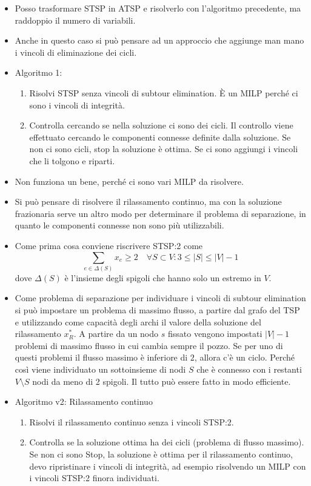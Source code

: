 \begin{itemize}
	\item Posso trasformare STSP in ATSP e risolverlo con l'algoritmo precedente, ma raddoppio il numero di variabili.
	\item Anche in questo caso si può pensare ad un approccio che aggiunge man mano i vincoli di eliminazione dei cicli.
	\item Algoritmo 1:
	\begin{enumerate}
		\item Risolvi STSP senza vincoli di subtour elimination. \`E un MILP perché ci sono i vincoli di integrità.
		\item Controlla cercando se nella soluzione ci sono dei cicli. Il controllo viene effettuato cercando le componenti connesse definite dalla soluzione. Se non ci sono cicli, stop la soluzione è ottima. Se ci sono aggiungi i vincoli che li tolgono e riparti.
	\end{enumerate}
	\item Non funziona un bene, perché ci sono vari MILP da risolvere.
	\item Si può pensare di risolvere il rilassamento continuo, ma con la soluzione frazionaria serve un altro modo per determinare il problema di separazione, in quanto le componenti connesse non sono più utilizzabili.
	\item Come prima cosa conviene riscrivere STSP:2 come
	$$
	\sum\limits_{e \in \varDelta(S)} x_e \geq 2 \quad \forall S \subset V : 3 \leq |S| \leq |V| -1
	$$
	dove $\varDelta(S)$ è l'insieme degli spigoli che hanno solo un estremo in $V$.
	\item Come problema di separazione per individuare i vincoli di subtour elimination si può impostare un problema di massimo flusso, a partire dal grafo del TSP e utilizzando come capacità degli archi il valore della soluzione del rilassamento $x_{R}^*$. A partire da un nodo $s$ fissato vengono impostati $|V|-1$ problemi di massimo flusso in cui cambia sempre il pozzo. Se per uno di questi problemi il flusso massimo è inferiore di $2$, allora c'è un ciclo. Perché così viene individuato un sottoinsieme di nodi $S$ che è connesso con i restanti $V\setminus S$ nodi da meno di 2 spigoli. Il tutto può essere fatto in modo efficiente.
	\item Algoritmo v2: Rilassamento continuo
	\begin{enumerate}
		\item Risolvi il rilassamento continuo senza i vincoli STSP:2.
		\item Controlla se la soluzione ottima ha dei cicli (problema di flusso massimo). Se non ci sono Stop, la soluzione è ottima per il rilassamento continuo, devo ripristinare i vincoli di integrità, ad esempio risolvendo un MILP con i vincoli STSP:2 finora individuati.

\end{enumerate}
\end{itemize}
